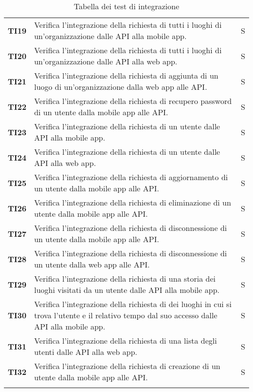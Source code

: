 \documentclass[../../piano-di-qualifica.tex]{subfiles}
\begin{document}
\begin{longtable}[H]{>{\centering\bfseries}m{3cm} >{}m{10cm} >{\centering\arraybackslash}m{3cm}}
  TI19               & Verifica l'integrazione della richiesta di tutti i luoghi di un'organizzazione dalle API alla mobile app.   & S \\

  TI20               & Verifica l'integrazione della richiesta di tutti i luoghi di un'organizzazione dalle API alla web app.   & S \\

  TI21               & Verifica l'integrazione della richiesta di aggiunta di un luogo di un'organizzazione dalla web app alle API\@.   & S \\

  TI22               & Verifica l'integrazione della richiesta di recupero password di un utente dalla mobile app alle API\@.   & S \\

  TI23               & Verifica l'integrazione della richiesta di un utente dalle API alla mobile app.   & S \\

  TI24               & Verifica l'integrazione della richiesta di un utente dalle API alla web app.   & S \\

  TI25               & Verifica l'integrazione della richiesta di aggiornamento di un utente dalla mobile app alle API\@.   & S \\

  TI26               & Verifica l'integrazione della richiesta di eliminazione di un utente dalla mobile app alle API\@.   & S \\

  TI27               & Verifica l'integrazione della richiesta di disconnessione di un utente dalla mobile app alle API\@.   & S \\

  TI28               & Verifica l'integrazione della richiesta di disconnessione di un utente dalla web app alle API\@.   & S \\

  TI29               & Verifica l'integrazione della richiesta di una storia dei luoghi visitati da un utente dalle API alla mobile app.   & S \\

  TI30               & Verifica l'integrazione della richiesta di dei luoghi in cui si trova l'utente e il relativo tempo dal suo accesso dalle API alla mobile app.   & S \\

  TI31               & Verifica l'integrazione della richiesta di una lista degli utenti dalle API alla web app.   & S \\

  TI32               & Verifica l'integrazione della richiesta di creazione di un utente dalla mobile app alle API\@.   & S \\

  \rowcolor{white}
  \caption{Tabella dei test di integrazione}%
  \label{tab:test_integrazione}
\end{longtable}
\end{document}
